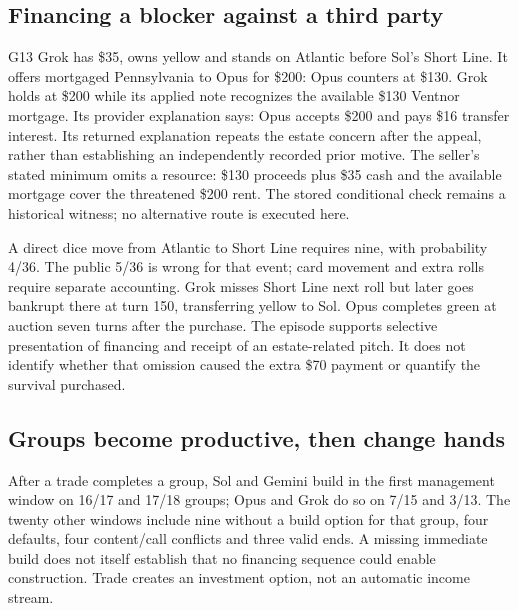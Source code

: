 \subsection{Financing a blocker against a third party}
G13 Grok has \$35, owns yellow and stands on Atlantic before Sol's Short Line. It offers mortgaged Pennsylvania to Opus for \$200:
Opus counters at \$130. Grok holds at \$200 while its applied note recognizes the available \$130 Ventnor mortgage. Its provider explanation says:
Opus accepts \$200 and pays \$16 transfer interest. Its returned explanation repeats the estate concern after the appeal, rather than establishing an independently recorded prior motive. The seller's stated minimum omits a resource: \$130 proceeds plus \$35 cash and the available mortgage cover the threatened \$200 rent. The stored conditional check remains a historical witness; no alternative route is executed here.

A direct dice move from Atlantic to Short Line requires nine, with probability 4/36. The public 5/36 is wrong for that event; card movement and extra rolls require separate accounting. Grok misses Short Line next roll but later goes bankrupt there at turn 150, transferring yellow to Sol. Opus completes green at auction seven turns after the purchase. The episode supports selective presentation of financing and receipt of an estate-related pitch. It does not identify whether that omission caused the extra \$70 payment or quantify the survival purchased.

\subsection{Groups become productive, then change hands}
After a trade completes a group, Sol and Gemini build in the first management window on 16/17 and 17/18 groups; Opus and Grok do so on 7/15 and 3/13. The twenty other windows include nine without a build option for that group, four defaults, four content/call conflicts and three valid ends. A missing immediate build does not itself establish that no financing sequence could enable construction. Trade creates an investment option, not an automatic income stream.

